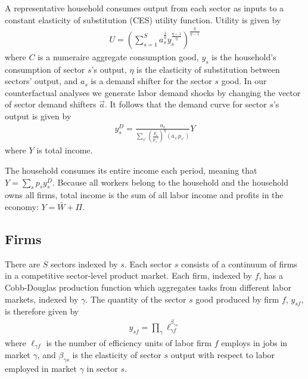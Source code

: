 \documentclass[12pt]{article}
\def\g{\gamma}
\theoremstyle{definition}
\theoremstyle{plain}
\begin{document}
A representative household consumes output from each sector as inputs to a constant elasticity of substitution (CES) utility function. Utility is given by
\begin{align}
	U =\left ( \sum_{s=1}^S a_s^\frac{1}{\eta} y_s^{\frac{\eta-1}{\eta}} \right )^{\frac{\eta}{\eta-1}} \label{eq:utility}
\end{align}
where $C$ is a numeraire aggregate consumption good, $y_s$ is the household's consumption of sector $s$'s output, $\eta$ is the elasticity of substitution between sectors' output, and $a_s$ is a demand shifter for the sector $s$ good. In our counterfactual analyses we generate labor demand shocks by changing the vector of sector demand shifters $\vec{a}$.  It follows that the demand curve for sector $s$'s output is given by 
\begin{align}
	y_s^D =  \frac{ a_s }{ \sum_{s'} \left(\frac{p_s}{p_s'}\right)^{\eta} \left(a_{s'} p_{s'}\right)}Y \label{eq:consumer_demand} %
\end{align}
where $Y$ is total income.

The household consumes its entire income each period, meaning that $Y= \sum_{s} p_s y_s^D$. Because all workers belong to the household and the household owns all firms, total income is the sum of all labor income and profits in the economy: $Y = \bar W + \Pi$.




\subsection{Firms}
\label{sec:model_firms}


There are $S$ sectors indexed by $s$. Each sector $s$ consists of a continuum of firms in a competitive sector-level product market. Each firm, indexed by $f$, has a Cobb-Douglas production function which aggregates tasks from different labor markets, indexed by $\g$.  The quantity of the sector $s$ good produced by firm $f$, $y_{sf}$, is therefore given by
\begin{align}
	y_{sf} = \prod_{\g} \ell_{\g f}^{\beta_{\g s}}  \label{eq:int_prod}
\end{align}
where $\ell_{\g f}$ is the number of efficiency units of labor firm $f$ employs in jobs in market $\g$, and $\beta_{\g s}$ is the elasticity of sector $s$ output with respect to labor employed in market $\g$ in sector $s$.

% 
\end{document}
